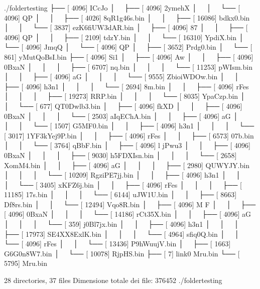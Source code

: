 \documentclass[letterpaper,10pt,italian,openany,oneside]{sphinxmanual}
\begin{document}
\begin{sphinxVerbatim}[commandchars=\\\{\}]
./folder\PYGZus{}testing
├── [       4096]  ICcJo
│   ├── [       4096]  2ymehX
│   │   └── [       4096]  QP
│   │       ├── [       4026]  8qR1g46s.bin
│   │       ├── [      16086]  bdkx0.bin
│   │       └── [       3837]  ezK6fiUW3dAR.bin
│   ├── [       4096]  87
│   │   ├── [       4096]  QP
│   │   ├── [       2109]  tdzY.bin
│   │   └── [      16310]  YpdiX.bin
│   └── [       4096]  JmqQ
│       └── [       4096]  QP
│           ├── [       3652]  Prdg0.bin
│           └── [        861]  yMutQoBsI.bin
├── [       4096]  Si1
│   ├── [       4096]  Aw
│   │   ├── [       4096]  0BxaN
│   │   │   ├── [       6707]  nq.bin
│   │   │   └── [      11253]  pWIsm.bin
│   │   ├── [       4096]  aG
│   │   │   └── [       9555]  ZbioiWDOw.bin
│   │   ├── [       4096]  h3n1
│   │   │   └── [       2694]  8m.bin
│   │   ├── [       4096]  rFes
│   │   │   ├── [      19273]  RRP.bin
│   │   │   └── [       8035]  YpaCzp.bin
│   │   └── [        677]  QT0Dwlb3.bin
│   ├── [       4096]  fkXD
│   │   ├── [       4096]  0BxaN
│   │   │   └── [       2503]  aIqEChA.bin
│   │   ├── [       4096]  aG
│   │   │   └── [       1507]  G5MF0.bin
│   │   ├── [       4096]  h3n1
│   │   │   └── [       3017]  1YF3kYej9P.bin
│   │   ├── [       4096]  rFes
│   │   ├── [       6573]  07b.bin
│   │   └── [       3764]  qBbF.bin
│   ├── [       4096]  l jPwu3
│   │   ├── [       4096]  0BxaN
│   │   │   ├── [       9030]  h5FDXIsn.bin
│   │   │   └── [       2658]  XomM4.bin
│   │   ├── [       4096]  aG
│   │   │   ├── [       2980]  QUWYJY.bin
│   │   │   └── [      10209]  RgziPE7jj.bin
│   │   ├── [       4096]  h3n1
│   │   │   └── [       3405]  xKFZ6j.bin
│   │   ├── [       4096]  rFes
│   │   │   ├── [      11185]  17s.bin
│   │   │   └── [       6144]  uJW1U.bin
│   │   ├── [       8663]  Df8rs.bin
│   │   └── [      12494]  Vqo8R.bin
│   ├── [       4096]  M F
│   │   ├── [       4096]  0BxaN
│   │   │   └── [      14186]  rCt35X.bin
│   │   ├── [       4096]  aG
│   │   │   └── [        359]  j0Bl7jx.bin
│   │   ├── [       4096]  h3n1
│   │   │   ├── [      17973]  SE4XX8ExlK.bin
│   │   │   └── [       4964]  sfiq0Q.bin
│   │   └── [       4096]  rFes
│   │       └── [      13436]  P9hWuujV.bin
│   ├── [       1663]  G6G0n8W7.bin
│   └── [      10078]  RjpHS.bin
├── [          7]  link\PYGZus{}0 \PYGZhy{}\PYGZgt{} Mru.bin
└── [       5795]  Mru.bin

28 directories, 37 files
Dimensione totale dei file: 376452      ./folder\PYGZus{}testing
\end{sphinxVerbatim}
\end{document}
